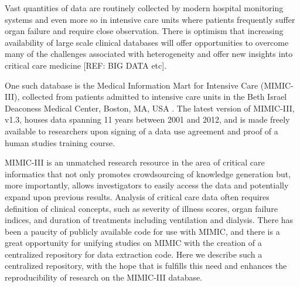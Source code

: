 \documentclass{bioinfo}
\begin{document}
Vast quantities of data are routinely collected by modern hospital monitoring systems and even more so in intensive care units where patients frequently suffer organ failure and require close observation. There is optimism that increasing availability of large scale clinical databases will offer opportunities to overcome many of the challenges associated with heterogeneity and offer new insights into critical care medicine [REF: BIG DATA etc]. 

One such database is the Medical Information Mart for Intensive Care (MIMIC-III), collected from patients admitted to intensive care units in the Beth Israel Deaconess Medical Center, Boston, MA, USA \cite{mimiciii}. The latest version of MIMIC-III, v1.3, houses data spanning 11 years between 2001 and 2012, and is made freely available to researchers upon signing of a data use agreement and proof of a human studies training course. 

MIMIC-III is an unmatched research resource in the area of critical care informatics that not only promotes crowdsourcing of knowledge generation but, more importantly, allows investigators to easily access the data and potentially expand upon previous results.
Analysis of critical care data often requires definition of clinical concepts, such as severity of illness scores, organ failure indices, and duration of treatments including ventilation and dialysis. 
There has been a paucity of publicly available code for use with MIMIC, and there is a great opportunity for unifying studies on MIMIC with the creation of a centralized repository for data extraction code. Here we describe such a centralized repository, with the hope that is fulfills this need and enhances the reproducibility of research on the MIMIC-III database.

\end{document}
